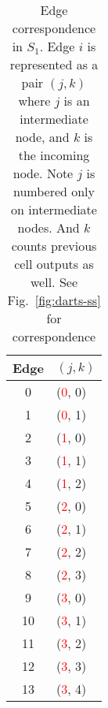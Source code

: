 \documentclass[runningheads]{llncs}
\begin{document}
\begin{table}
	\begin{center}
		\caption{Edge correspondence in $S_1$. Edge $i$ is represented as a pair $(j, k)$ where $j$ is an intermediate node, and $k$ is the incoming node. Note $j$ is numbered only on intermediate nodes. And $k$ counts previous cell outputs as well. See Fig.~\ref{fig:darts-ss} for correspondence}
		\label{tab:darts-edge-s1}
		\begin{footnotesize}
			\begin{tabular}{cl}
				\hline
				Edge & $(j, k)$  \\
				\hline
				0 & (\textcolor{red}{0}, 0)\\
				1 & (\textcolor{red}{0}, 1)\\
				2 & (\textcolor{red}{1}, 0)\\
				3 & (\textcolor{red}{1}, 1)\\
				4 & (\textcolor{red}{1}, 2)\\
				5 & (\textcolor{red}{2}, 0)\\
				6 & (\textcolor{red}{2}, 1)\\
				7 & (\textcolor{red}{2}, 2)\\
				8 & (\textcolor{red}{2}, 3)\\
				9 & (\textcolor{red}{3}, 0)\\
				10 & (\textcolor{red}{3}, 1)\\
				11 & (\textcolor{red}{3}, 2)\\
				12 & (\textcolor{red}{3}, 3)\\
				13 & (\textcolor{red}{3}, 4)\\
				\hline
			\end{tabular}
		\end{footnotesize}
	\end{center}
	
\end{table}
\end{document}
